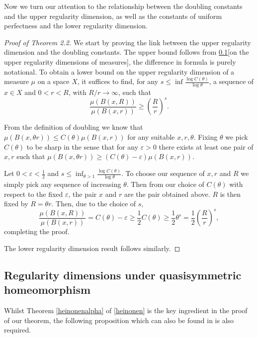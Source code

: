 \documentclass[12pt]{amsart}
\numberwithin{equation}{section}
\renewcommand{\ge}{\geqslant}
\renewcommand{\le}{\leqslant}
\begin{document}
 Now we turn our attention to the relationship between the doubling constants and the upper regularity dimension, as well as the constants of uniform perfectness and the lower regularity dimension.

\begin{proof}[Proof of Theorem 2.2]
We start by proving the link between the upper regularity dimension and the doubling constants. The upper bound follows from \ref{}[on the upper regularity dimensions of measures], the difference in formula is purely notational. To obtain a lower bound on the upper regularity dimension of a measure $\mu$ on a space $X$, it suffices to find, for any $s\le \inf\frac{\log C(\theta)}{\log \theta}$, a sequence of $x\in X$ and $0<r<R$, with $R/r \rightarrow \infty$, such that 
\[
\frac{\mu(B(x,R))}{\mu(B(x,r))} \ge \left(\frac{R}{r}\right)^s.
\]


From the definition of doubling we know that $\mu(B(x,\theta r) ) \le C(\theta) \mu(B(x,r))$ for any suitable $x,r, \theta$. Fixing $\theta$ we pick $C(\theta)$ to be sharp in the sense that for any $\varepsilon>0$ there exists at least one pair of $x,r$ such that $\mu(B(x,\theta r) ) \ge (C(\theta)-\varepsilon) \mu(B(x,r))$. 

Let $0 < \varepsilon< \frac{1}{2}$ and $s \le \inf_{\theta > 1}\frac{\log C(\theta)}{\log \theta}$. To choose our sequence of $x,r$ and $R$ we simply pick any sequence of increasing $\theta$. Then from our choice of $C(\theta)$ with respect to the fixed $\varepsilon$, the pair $x$ and $r$ are the pair obtained above. $R$ is then fixed by $R = \theta r$. Then, due to the choice of $s$,
\[
\frac{\mu(B(x,R))}{\mu(B(x,r))} = C(\theta)-\varepsilon \ge \frac{1}{2} C(\theta)  \ge \frac{1}{2}\theta^s = \frac{1}{2}\left(\frac{R}{r} \right)^s,
\]
completing the proof.

The lower regularity dimension result follows similarly.
\end{proof}









\subsection{Regularity dimensions under quasisymmetric homeomorphism}



Whilst Theorem \ref{heinonenalpha} of \ref{heinonen} is the key ingredient in the proof of our theorem, the following proposition which can also be found in \cite{heinonen} is also required.
\end{document}
